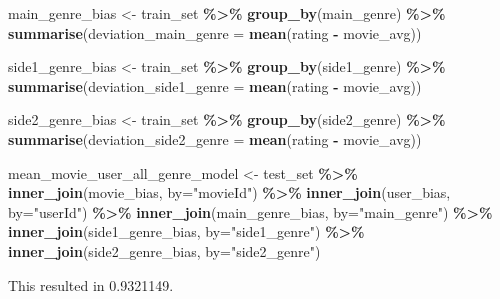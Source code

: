 \documentclass[
]{article}
\newenvironment{Shaded}{\begin{snugshade}}{\end{snugshade}}
\newcommand{\AttributeTok}[1]{\textcolor[rgb]{0.13,0.29,0.53}{#1}}
\newcommand{\FunctionTok}[1]{\textcolor[rgb]{0.13,0.29,0.53}{\textbf{#1}}}
\newcommand{\NormalTok}[1]{#1}
\newcommand{\OtherTok}[1]{\textcolor[rgb]{0.56,0.35,0.01}{#1}}
\newcommand{\SpecialCharTok}[1]{\textcolor[rgb]{0.81,0.36,0.00}{\textbf{#1}}}
\newcommand{\StringTok}[1]{\textcolor[rgb]{0.31,0.60,0.02}{#1}}
\begin{document}
\begin{Shaded}
\begin{Highlighting}[]
\NormalTok{main\_genre\_bias }\OtherTok{\textless{}{-}}\NormalTok{ train\_set }\SpecialCharTok{\%\textgreater{}\%}
  \FunctionTok{group\_by}\NormalTok{(main\_genre) }\SpecialCharTok{\%\textgreater{}\%}
  \FunctionTok{summarise}\NormalTok{(}\AttributeTok{deviation\_main\_genre =} \FunctionTok{mean}\NormalTok{(rating }\SpecialCharTok{{-}}\NormalTok{ movie\_avg))}

\NormalTok{side1\_genre\_bias }\OtherTok{\textless{}{-}}\NormalTok{ train\_set }\SpecialCharTok{\%\textgreater{}\%}
  \FunctionTok{group\_by}\NormalTok{(side1\_genre) }\SpecialCharTok{\%\textgreater{}\%}
  \FunctionTok{summarise}\NormalTok{(}\AttributeTok{deviation\_side1\_genre =} \FunctionTok{mean}\NormalTok{(rating }\SpecialCharTok{{-}}\NormalTok{ movie\_avg))}

\NormalTok{side2\_genre\_bias }\OtherTok{\textless{}{-}}\NormalTok{ train\_set }\SpecialCharTok{\%\textgreater{}\%}
  \FunctionTok{group\_by}\NormalTok{(side2\_genre) }\SpecialCharTok{\%\textgreater{}\%}
  \FunctionTok{summarise}\NormalTok{(}\AttributeTok{deviation\_side2\_genre =} \FunctionTok{mean}\NormalTok{(rating }\SpecialCharTok{{-}}\NormalTok{ movie\_avg))}

\NormalTok{mean\_movie\_user\_all\_genre\_model }\OtherTok{\textless{}{-}}\NormalTok{ test\_set }\SpecialCharTok{\%\textgreater{}\%}
  \FunctionTok{inner\_join}\NormalTok{(movie\_bias, }\AttributeTok{by=}\StringTok{"movieId"}\NormalTok{) }\SpecialCharTok{\%\textgreater{}\%}
  \FunctionTok{inner\_join}\NormalTok{(user\_bias, }\AttributeTok{by=}\StringTok{"userId"}\NormalTok{) }\SpecialCharTok{\%\textgreater{}\%}
  \FunctionTok{inner\_join}\NormalTok{(main\_genre\_bias, }\AttributeTok{by=}\StringTok{"main\_genre"}\NormalTok{) }\SpecialCharTok{\%\textgreater{}\%}
  \FunctionTok{inner\_join}\NormalTok{(side1\_genre\_bias, }\AttributeTok{by=}\StringTok{"side1\_genre"}\NormalTok{) }\SpecialCharTok{\%\textgreater{}\%}
  \FunctionTok{inner\_join}\NormalTok{(side2\_genre\_bias, }\AttributeTok{by=}\StringTok{"side2\_genre"}\NormalTok{)}
\end{Highlighting}
\end{Shaded}

This resulted in 0.9321149.
\end{document}
